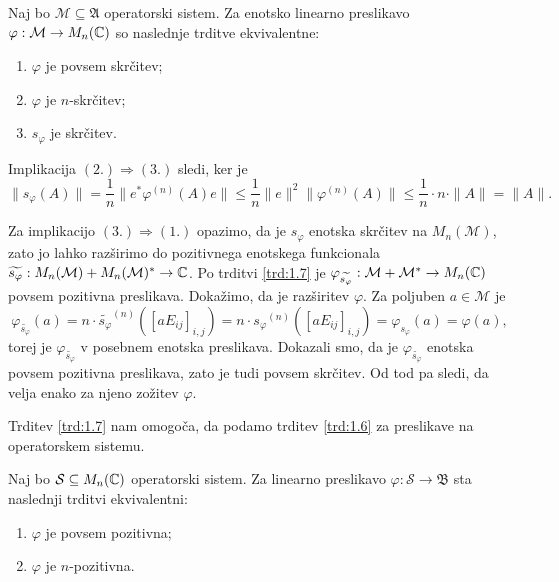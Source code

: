 \begin{posledica}
    Naj bo $\mathcal{M} \subseteq \mathfrak{A}$ operatorski sistem.
    Za enotsko linearno preslikavo $\varphi: \mathcal{M} \to M_n (\mathbb C)$ so naslednje trditve ekvivalentne:
    \begin{enumerate}
        \item $\varphi$ je povsem skrčitev;
        \item $\varphi$ je $n$-skrčitev;
        \item $s_\varphi$ je skrčitev.
    \end{enumerate}
\end{posledica}

\begin{dokaz}
    Implikacija $(2.) \Rightarrow (3.)$ sledi, ker je 
    $$\| s_\varphi (A) \| = \frac{1}{n} \|e^* \varphi^{(n)}(A) e\| \leq \frac{1}{n} \| e\|^2 \| \varphi^{(n)} (A)\| \leq \frac{1}{n} \cdot n \cdot \| A\|  = \| A\|.$$

    Za implikacijo $(3.) \Rightarrow (1.)$ opazimo, da je $s_\varphi$ enotska skrčitev na $M_n (\mathcal{M})$,
    zato jo lahko razširimo do pozitivnega enotskega funkcionala $\widetilde{s_\varphi}: M_n (\mathcal{M}) + M_n (\mathcal{M})^* \to \mathbb C$.
    Po trditvi \ref{trd:1.7} je $\varphi_{\widetilde{s_\varphi}}: \mathcal{M} + \mathcal{M}^* \to M_n (\mathbb C)$ povsem pozitivna preslikava.
    Dokažimo, da je razširitev $\varphi$.
    Za poljuben $a \in \mathcal{M}$ je 
    $$\varphi_{\widetilde{s_\varphi}} (a) = n \cdot \widetilde{s_{\varphi}} ^{(n)} ([a E_{ij}]_{i, j}) = n \cdot {s_{\varphi}} ^{(n)} ([a E_{ij}]_{i, j}) = \varphi_{s_\varphi} (a) = \varphi(a),$$
    torej je $\varphi_{\widetilde{s_\varphi}}$ v posebnem enotska preslikava.
    Dokazali smo, da je $\varphi_{\widetilde{s_\varphi}}$ enotska povsem pozitivna preslikava, zato je tudi povsem skrčitev.
    Od tod pa sledi, da velja enako za njeno zožitev $\varphi$.
\end{dokaz}

Trditev \ref{trd:1.7} nam omogoča, da podamo trditev \ref{trd:1.6} za preslikave na operatorskem sistemu.

\begin{posledica}
    Naj bo $\mathcal{S} \subseteq M_n (\mathbb C)$ operatorski sistem. 
    Za linearno preslikavo $\varphi: \mathcal{S} \to \mathfrak{B}$ sta naslednji
    trditvi ekvivalentni:
    \begin{enumerate}
        \item $\varphi$ je povsem pozitivna;
        \item $\varphi$ je $n$-pozitivna.
    \end{enumerate}
\end{posledica}

